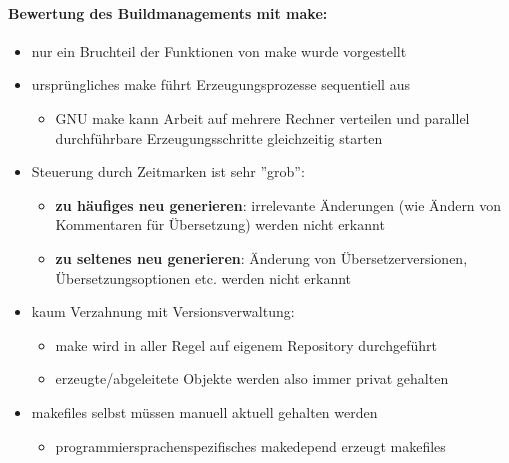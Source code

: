\paragraph{Bewertung des Buildmanagements mit make:}
\begin{itemize}
	\item nur ein Bruchteil der Funktionen von make wurde vorgestellt
	\item ursprüngliches make führt Erzeugungsprozesse sequentiell aus
	\begin{itemize}
		\item GNU make kann Arbeit auf mehrere Rechner verteilen und parallel durchführbare Erzeugungsschritte gleichzeitig starten
	\end{itemize}
	\item Steuerung durch Zeitmarken ist sehr ''grob'':
	\begin{itemize}
		\item \textbf{zu häufiges neu generieren}: irrelevante Änderungen (wie Ändern von Kommentaren für Übersetzung) werden nicht erkannt 
		\item \textbf{zu seltenes neu generieren}: Änderung von Übersetzerversionen, Übersetzungsoptionen etc. werden nicht erkannt
	\end{itemize}
	\item kaum Verzahnung mit Versionsverwaltung:
	\begin{itemize}
		\item make wird in aller Regel auf eigenem Repository durchgeführt
		\item erzeugte/abgeleitete Objekte werden also immer privat gehalten
	\end{itemize}
	\item makefiles selbst müssen manuell aktuell gehalten werden
	\begin{itemize}
		\item programmiersprachenspezifisches makedepend erzeugt makefiles
	\end{itemize}
\end{itemize}

